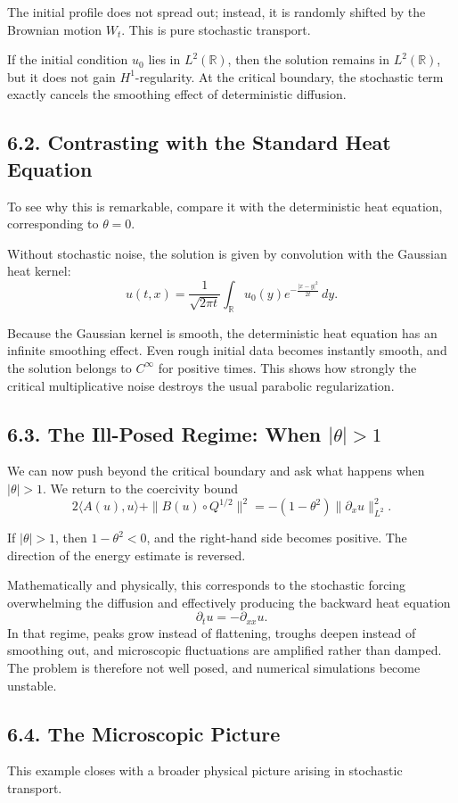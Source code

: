 \documentclass[11pt]{article}
\theoremstyle{definition}
\theoremstyle{remark}
\begin{document}
The initial profile does not spread out; instead, it is randomly shifted by the Brownian motion \(W_t\). This is pure stochastic transport.

If the initial condition \(u_0\) lies in \(L^2(\mathbb R)\), then the solution remains in \(L^2(\mathbb R)\), but it does not gain \(H^1\)-regularity. At the critical boundary, the stochastic term exactly cancels the smoothing effect of deterministic diffusion.

\subsection*{6.2. Contrasting with the Standard Heat Equation}
To see why this is remarkable, compare it with the deterministic heat equation, corresponding to \(\theta=0\).

Without stochastic noise, the solution is given by convolution with the Gaussian heat kernel:
\[
u(t,x)=\frac{1}{\sqrt{2\pi t}}
\int_{\mathbb R}
u_0(y)e^{-\frac{|x-y|^2}{2t}}\,dy.
\]

Because the Gaussian kernel is smooth, the deterministic heat equation has an infinite smoothing effect. Even rough initial data becomes instantly smooth, and the solution belongs to \(C^\infty\) for positive times. This shows how strongly the critical multiplicative noise destroys the usual parabolic regularization.

\subsection*{6.3. The Ill-Posed Regime: When \(|\theta|>1\)}
We can now push beyond the critical boundary and ask what happens when \(|\theta|>1\). We return to the coercivity bound
\[
2\langle A(u),u\rangle+\|B(u)\circ Q^{1/2}\|^2
=
-(1-\theta^2)\|\partial_x u\|_{L^2}^2.
\]

If \(|\theta|>1\), then \(1-\theta^2<0\), and the right-hand side becomes positive. The direction of the energy estimate is reversed.

Mathematically and physically, this corresponds to the stochastic forcing overwhelming the diffusion and effectively producing the backward heat equation
\[
\partial_t u=-\partial_{xx}u.
\]
In that regime, peaks grow instead of flattening, troughs deepen instead of smoothing out, and microscopic fluctuations are amplified rather than damped. The problem is therefore not well posed, and numerical simulations become unstable.

\subsection*{6.4. The Microscopic Picture}
This example closes with a broader physical picture arising in stochastic transport.
\end{document}
